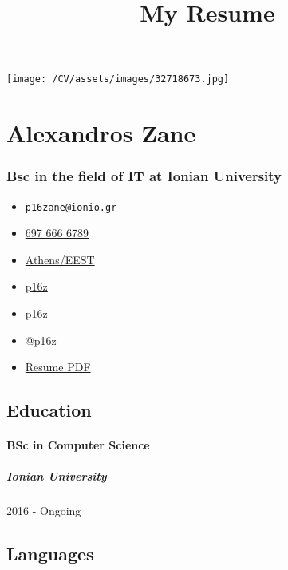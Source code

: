 \documentclass[
  english,
]{article}
\title{My Resume}
\author{}
\date{}
\providecommand{\tightlist}{%
  \setlength{\itemsep}{0pt}\setlength{\parskip}{0pt}}
\begin{document}
\maketitle

\texttt{[image: /CV/assets/images/32718673.jpg]}

\hypertarget{alexandros-zane}{%
\section{Alexandros Zane}\label{alexandros-zane}}

\hypertarget{bsc-in-the-field-of-it-at-ionian-university}{%
\subsubsection{Bsc in the field of IT at Ionian
University}\label{bsc-in-the-field-of-it-at-ionian-university}}

\begin{itemize}
\tightlist
\item
  \emph{} \href{mailto:p16zane@ionio.gr}{\nolinkurl{p16zane@ionio.gr}}
\item
  \emph{} \href{tel:697\%20666\%206789}{697 666 6789}
\item
  \emph{} \href{}{Athens/EEST}
\item
  \emph{} \href{https://linkedin.com/in/p16z}{p16z}
\item
  \emph{} \href{http://github.com/p16z}{p16z}
\item
  \emph{} \href{https://twitter.com/@p16z}{@p16z}
\item
  \emph{} \href{http://www.africau.edu/images/default/sample.pdf}{Resume
  PDF}
\end{itemize}

\hypertarget{education}{%
\subsection{Education}\label{education}}

\hypertarget{bsc-in-computer-science}{%
\paragraph{BSc in Computer Science}\label{bsc-in-computer-science}}

\hypertarget{ionian-university}{%
\subparagraph{Ionian University}\label{ionian-university}}

2016 - Ongoing

\hypertarget{languages}{%
\subsection{Languages}\label{languages}}
\end{document}
